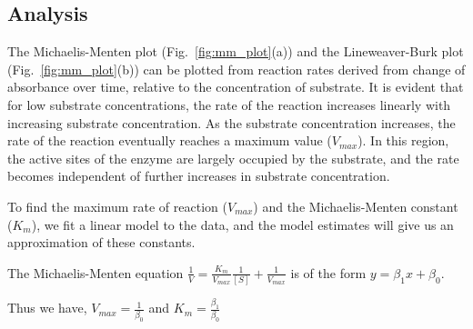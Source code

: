 \documentclass[a4paper,11pt]{article}
\begin{document}
            \subsection*{Analysis}
                The Michaelis-Menten plot (Fig.~\ref{fig:mm_plot}(a)) and the Lineweaver-Burk plot 
                (Fig.~\ref{fig:mm_plot}(b)) can be plotted from reaction rates derived 
                from change of absorbance over time, relative to the concentration of substrate. 
                It is evident that for low substrate concentrations, the rate of the reaction increases 
                linearly with increasing substrate concentration. As the substrate concentration increases, 
                the rate of the reaction eventually reaches a maximum value ($V_{max}$). 
                In this region, the active sites of the enzyme are largely occupied by the substrate, 
                and the rate becomes independent of further increases in substrate concentration.

                To find the maximum rate of reaction ($V_{max}$) and the Michaelis-Menten constant ($K_m$),
                we fit a linear model to the data, and the model estimates will give us an approximation of these constants.

                The Michaelis-Menten equation
                $ \frac{1}{V} = \frac{K_m}{V_{max}}\frac{1}{[S]} + \frac{1}{V_{max}} $
                is of the form
                $ y = \beta_1x + \beta_0 $.

                \begin{center}
                    Thus we have,
                    $ V_{max} = \frac{1}{\beta_0} $ and $ K_m = \frac{\beta_1}{\beta_0}  $
                \end{center}
\end{document}

